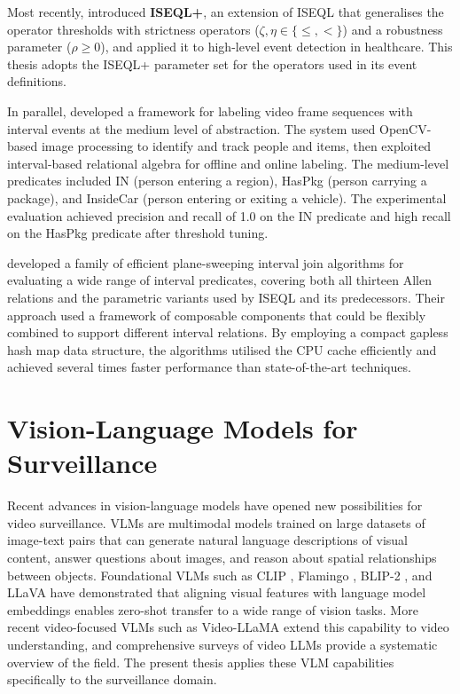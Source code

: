 Most recently, \citet{persia2026iseqlplus} introduced \textbf{ISEQL+}, an extension of ISEQL that generalises the operator thresholds with strictness operators ($\zeta,\eta \in \{\le,<\}$) and a robustness parameter ($\rho \ge 0$), and applied it to high-level event detection in healthcare. This thesis adopts the ISEQL+ parameter set for the operators used in its event definitions.

In parallel, \citet{persia2017labeling} developed a framework for labeling video frame sequences with interval events at the medium level of abstraction. The system used OpenCV-based image processing to identify and track people and items, then exploited interval-based relational algebra for offline and online labeling. The medium-level predicates included IN (person entering a region), HasPkg (person carrying a package), and InsideCar (person entering or exiting a vehicle). The experimental evaluation achieved precision and recall of 1.0 on the IN predicate and high recall on the HasPkg predicate after threshold tuning.

\citet{piatov2021cache} developed a family of efficient plane-sweeping interval join algorithms for evaluating a wide range of interval predicates, covering both all thirteen Allen relations and the parametric variants used by ISEQL and its predecessors. Their approach used a framework of composable components that could be flexibly combined to support different interval relations. By employing a compact gapless hash map data structure, the algorithms utilised the CPU cache efficiently and achieved several times faster performance than state-of-the-art techniques.

\section{Vision-Language Models for Surveillance}

Recent advances in vision-language models have opened new possibilities for video surveillance. VLMs are multimodal models trained on large datasets of image-text pairs that can generate natural language descriptions of visual content, answer questions about images, and reason about spatial relationships between objects. Foundational VLMs such as CLIP \citep{radford2021clip}, Flamingo \citep{alayrac2022flamingo}, BLIP-2 \citep{li2023blip2}, and LLaVA \citep{liu2024llava} have demonstrated that aligning visual features with language model embeddings enables zero-shot transfer to a wide range of vision tasks. More recent video-focused VLMs such as Video-LLaMA \citep{zhang2023videollama} extend this capability to video understanding, and comprehensive surveys of video LLMs \citep{tang2025vidllm} provide a systematic overview of the field. The present thesis applies these VLM capabilities specifically to the surveillance domain.

